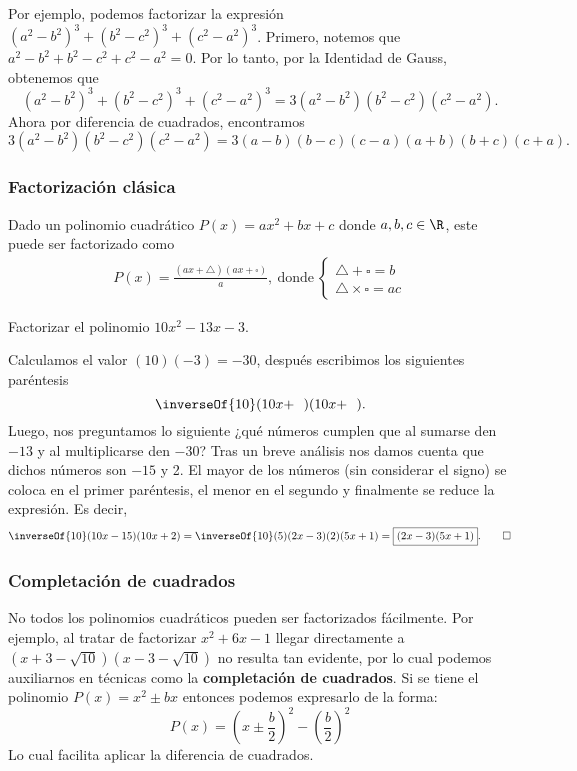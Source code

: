 Por ejemplo, podemos factorizar la expresión $(a^2 - b^2)^3 + (b^2 - c^2)^3 + (c^2 - a^2)^3$.
Primero, notemos que $a^2 - b^2 + b^2 - c^2 + c^2 - a^2 = 0$.
Por lo tanto, por la Identidad de Gauss, obtenemos que
\[
    (a^2 - b^2)^3 + (b^2 - c^2)^3 + (c^2 - a^2)^3 = 3 (a^2 - b^2)(b^2 - c^2)(c^2 - a^2).
\]
Ahora por diferencia de cuadrados, encontramos
\[
    3 (a^2 - b^2)(b^2 - c^2)(c^2 - a^2) = 3 (a - b)(b - c)(c - a) (a + b)(b + c)(c + a).
\]



\subsubsection{Factorización clásica}

Dado un polinomio cuadrático $P(x) = ax^2 + bx + c$ donde $a, b, c \in \R$, este puede ser factorizado como
\begin{gather*}
    P(x) = \frac{(ax + \triangle)(ax + \square)}{a},\ \text{donde}\
    \begin{cases}
        \triangle + \square = b\\
        \triangle \times \square = ac
    \end{cases}
\end{gather*}

\begin{example}
    Factorizar el polinomio $10x^2 - 13x - 3$.
\end{example}
\begin{solution}
    Calculamos el valor $(10)(-3) = -30$, después escribimos los siguientes paréntesis
    \[
        \inverseOf{10} (10x + \ \ )(10x + \ \ ).
    \]
    Luego, nos preguntamos lo siguiente ¿qué números cumplen que al sumarse den $-13$ y al multiplicarse den $-30$?
    Tras un breve análisis nos damos cuenta que dichos números son $-15$ y 2.
    El mayor de los números (sin considerar el signo) se coloca en el primer paréntesis, el menor en el segundo y finalmente se reduce la expresión.
    Es decir,
    \[
        \inverseOf{10} (10x - 15)(10x + 2) = \inverseOf{10} (5)(2x - 3)(2)(5x + 1) = \boxed{(2x - 3)(5x + 1)}. \qedhere
    \]
\end{solution}



\subsubsection{Completación de cuadrados}

No todos los polinomios cuadráticos pueden ser factorizados fácilmente.
Por ejemplo, al tratar de factorizar $x^2 + 6x - 1$ llegar directamente a $(x + 3 - \sqrt {10})(x-3-\sqrt {10})$ no resulta tan evidente, por lo cual podemos auxiliarnos en técnicas como la \textbf{completación de cuadrados}.
Si se tiene el polinomio $P(x) = x^2 \pm bx$ entonces podemos expresarlo de la forma:
\[
    P(x) = \left( x \pm \frac{b}{2} \right)^2 - \left( \frac{b}{2} \right)^2
\]
Lo cual facilita aplicar la diferencia de cuadrados.

